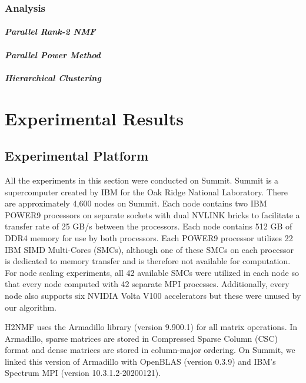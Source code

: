 \documentclass[conference,compsoc]{IEEEtran}
\begin{document}
\subsubsection{Analysis}
\label{sec:analysis}

\paragraph{\emph{Parallel Rank-2 NMF}}

\paragraph{\emph{Parallel Power Method}}

\paragraph{\emph{Hierarchical Clustering}}

\section{Experimental Results}

\subsection{Experimental Platform}
All the experiments in this section were conducted on Summit. Summit is a supercomputer created by IBM for the Oak Ridge National Laboratory. 
There are approximately 4,600 nodes on Summit. Each node contains two IBM POWER9 processors on separate sockets with dual NVLINK bricks to facilitate a transfer rate of 
25 GB/s between the processors. Each node contains 512 GB of DDR4 memory for use by both processors. Each POWER9 processor utilizes 22 IBM SIMD Multi-Cores (SMCs), 
although one of these SMCs on each processor is dedicated to memory transfer and is therefore not available for computation. 
For node scaling experiments, all 42 available SMCs were utilized in each node so that every node computed with 42 separate MPI processes.
Additionally, every node also supports six NVIDIA Volta V100 accelerators but these were unused by our algorithm. 

H2NMF uses the Armadillo library (version 9.900.1) for all matrix operations. 
In Armadillo, sparse matrices are stored in Compressed Sparse Column (CSC) format and dense matrices are stored in column-major ordering.
On Summit, we linked this version of Armadillo with OpenBLAS (version 0.3.9) and IBM's Spectrum MPI (version 10.3.1.2-20200121).
\end{document}
